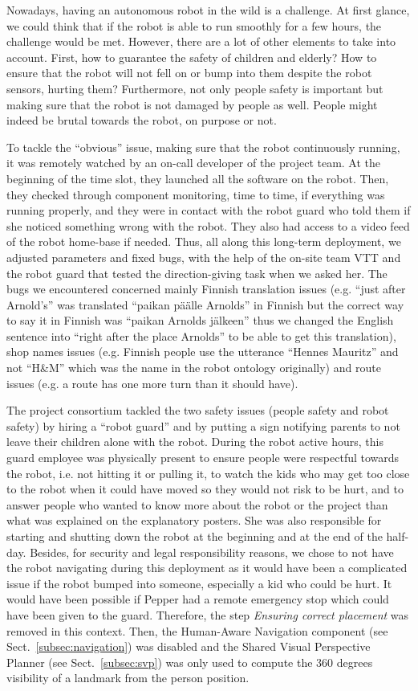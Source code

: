 \documentclass[a4paper,11pt,twoside]{StyleThese}
\begin{document}
Nowadays, having an autonomous robot in the wild is a challenge. At first glance, we could think that if the robot is able to run smoothly for a few hours, the challenge would be met. However, there are a lot of other elements to take into account. First, how to guarantee the safety of children and elderly? How to ensure that the robot will not fell on or bump into them despite the robot sensors, hurting them? Furthermore, not only people safety is important but making sure that the robot is not damaged by people as well. People might indeed be brutal towards the robot, on purpose or not. 

To tackle the ``obvious'' issue, making sure that the robot continuously running, it was remotely watched by an on-call developer of the project team. At the beginning of the time slot, they launched all the software on the robot. Then, they checked through component monitoring, time to time, if everything was running properly, and they were in contact with the robot guard who told them if she noticed something wrong with the robot. They also had access to a video feed of the robot home-base if needed. Thus, all along this long-term deployment, we adjusted parameters and fixed bugs, with the help of the on-site team VTT and the robot guard that tested the direction-giving task when we asked her. The bugs we encountered concerned mainly Finnish translation issues (e.g. ``just after Arnold's'' was translated ``paikan päälle Arnolds'' in Finnish but the correct way to say it in Finnish was ``paikan Arnolds jälkeen'' thus we changed the English sentence into ``right after the place Arnolds'' to be able to get this translation), shop names issues (e.g. Finnish people use the utterance ``Hennes Mauritz'' and not ``H\&M'' which was the name in the robot ontology originally) and route issues (e.g. a route has one more turn than it should have).

The project consortium tackled the two safety issues (people safety and robot safety) by hiring a ``robot guard'' and by putting a sign notifying parents to not leave their children alone with the robot. During the robot active hours, this guard employee was physically present to ensure people were respectful towards the robot, i.e. not hitting it or pulling it, to watch the kids who may get too close to the robot when it could have moved so they would not risk to be hurt, and to answer people who wanted to know more about the robot or the project than what was explained on the explanatory posters. She was also responsible for starting and shutting down the robot at the beginning and at the end of the half-day. Besides, for security and legal responsibility reasons, we chose to not have the robot navigating during this deployment as it would have been a complicated issue if the robot bumped into someone, especially a kid who could be hurt. It would have been possible if Pepper had a remote emergency stop which could have been given to the guard. Therefore, the step \textit{Ensuring correct placement} was removed in this context. Then, the Human-Aware Navigation component (see Sect.~\ref{subsec:navigation}) was disabled and the Shared Visual Perspective Planner (see Sect.~\ref{subsec:svp}) was only used to compute the 360 degrees visibility of a landmark from the person position.
\end{document}
